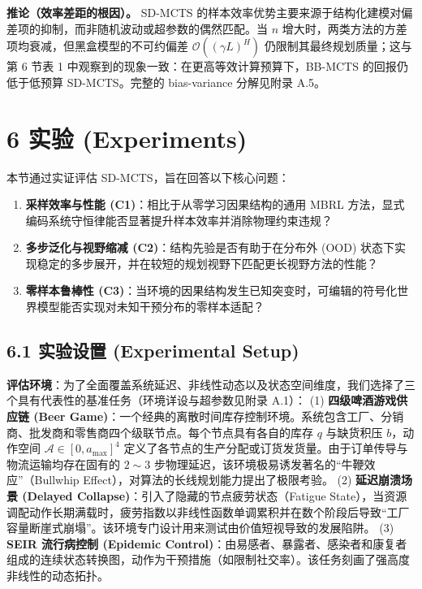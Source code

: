 \documentclass[UTF8]{ctexart}
\begin{document}
\textbf{推论（效率差距的根因）。} SD-MCTS 的样本效率优势主要来源于结构化建模对偏差项的抑制，而非随机波动或超参数的偶然匹配。当 $n$ 增大时，两类方法的方差项均衰减，但黑盒模型的不可约偏差 $\mathcal{O}((\gamma L)^H)$ 仍限制其最终规划质量；这与第 6 节表 1 中观察到的现象一致：在更高等效计算预算下，BB-MCTS 的回报仍低于低预算 SD-MCTS。完整的 bias-variance 分解见附录 A.5。

\hypertarget{ux5b9eux9a8c-experiments}{%
\section{6 实验 (Experiments)}\label{ux5b9eux9a8c-experiments}}

本节通过实证评估 SD-MCTS，旨在回答以下核心问题：

\begin{enumerate}
\item \textbf{采样效率与性能 (C1)}：相比于从零学习因果结构的通用 MBRL 方法，显式编码系统守恒律能否显著提升样本效率并消除物理约束违规？
\item \textbf{多步泛化与视野缩减 (C2)}：结构先验是否有助于在分布外 (OOD) 状态下实现稳定的多步展开，并在较短的规划视野下匹配更长视野方法的性能？
\item \textbf{零样本鲁棒性 (C3)}：当环境的因果结构发生已知突变时，可编辑的符号化世界模型能否实现对未知干预分布的零样本适配？
\end{enumerate}

\hypertarget{ux5b9eux9a8cux8bbeux7f6e-experimental-setup}{%
\subsection{6.1 实验设置 (Experimental
Setup)}\label{ux5b9eux9a8cux8bbeux7f6e-experimental-setup}}

\textbf{评估环境}：为了全面覆盖系统延迟、非线性动态以及状态空间维度，我们选择了三个具有代表性的基准任务（环境详设与超参数见附录
A.1）： (1) \textbf{四级啤酒游戏供应链 (Beer
Game)}：一个经典的离散时间库存控制环境。系统包含工厂、分销商、批发商和零售商四个级联节点。每个节点具有各自的库存
\(q\) 与缺货积压 \(b\)，动作空间 \(\mathcal{A} \in [0, a_{\max}]^4\)
定义了各节点的生产分配或订货发货量。由于订单传导与物流运输均存在固有的
\(2 \sim 3\) 步物理延迟，该环境极易诱发著名的``牛鞭效应''（Bullwhip
Effect），对算法的长线规划能力提出了极限考验。 (2) \textbf{延迟崩溃场景
(Delayed Collapse)}：引入了隐藏的节点疲劳状态（Fatigue
State），当资源调配动作长期满载时，疲劳指数以非线性函数单调累积并在数个阶段后导致``工厂容量断崖式崩塌''。该环境专门设计用来测试由价值短视导致的发展陷阱。
(3) \textbf{SEIR 流行病控制 (Epidemic
Control)}：由易感者、暴露者、感染者和康复者组成的连续状态转换图，动作为干预措施（如限制社交率）。该任务刻画了强高度非线性的动态拓扑。
\end{document}
